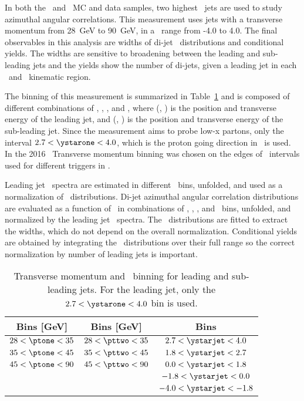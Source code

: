 In both the \pp\ and \pPb\ MC and data samples, two highest \pt\ jets are used to study azimuthal angular correlations. This measurement uses jets with a transverse momentum from 28~GeV to 90~GeV, in a \ystar\ range from -4.0 to 4.0. The final observables in this analysis are widths of di-jet \Dphi\ distributions and conditional yields. The widths are sensitive to broadening between the leading and sub-leading jets and the yields show the number of di-jets, given a leading jet in each \pT\ and \ystar\ kinematic region. 

The binning of this measurement is summarized in  Table~\ref{tab:binning} and is composed of different combinations of \ystarone, \ystartwo, \ptone, and \pttwo, where (\ystarone, \ptone) is the position and transverse energy of the leading jet, and (\ystartwo, \pttwo) is the position and transverse energy of the sub-leading jet. Since the measurement aims to probe low-x partons, only the interval $2.7<\ystarone<4.0$, which is the proton going direction in \pPb\ is used. In the 2016 \pPb\ Transverse momentum binning was chosen on the edges of \pt\ intervals used for different triggers in \pp. 

Leading jet \ptone\ spectra are estimated in different \ystarone\ bins, unfolded, and used as a normalization of \Dphi\ distributions. Di-jet azimuthal angular correlation distributions are evaluated as a function of \Dphi\ in combinations of \ystarone, \ystartwo, \ptone, and \pttwo\ bins, unfolded, and normalized by the leading jet \pt\ spectra. The \Dphi\ distributions are fitted to extract the widths, which do not depend on the overall normalization. Conditional yields are obtained by integrating the \Dphi\ distributions over their full range so the correct normalization by number of leading jets is important. 

\begin{table}
	\centering
	\begin{tabular}{|| c | c | c || } 
		\hline
		\ptone Bins [GeV] & \pttwo Bins [GeV] & \ystartwo Bins \\ 
		\hline
		$28<\ptone<35$   & $28<\pttwo<35$  & $2.7<\ystarjet<4.0$ \\ 
		$35<\ptone<45$   & $35<\pttwo<45$  & $1.8<\ystarjet<2.7$ \\ 
		$45<\ptone<90$   & $45<\pttwo<90$  & $0.0<\ystarjet<1.8$ \\
						 & 				   & $-1.8<\ystarjet<0.0$ \\
						 &				   & $-4.0<\ystarjet<-1.8$ \\
		\hline
	\end{tabular}
	\caption{\label{tab:binning} Transverse momentum and \ystar\ binning for leading and sub-leading jets. For the leading jet, only the $2.7<\ystarone<4.0$ bin is used. }
\end{table}

